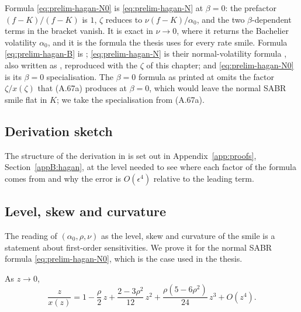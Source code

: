\documentclass[../../../main.tex]{subfiles}
\begin{document}
Formula \eqref{eq:prelim-hagan-N0} is \eqref{eq:prelim-hagan-N} at $\beta=0$: the prefactor $(f-K)/(f-K)$ is $1$, $\zeta$ reduces to $\nu(f-K)/\alpha_0$, and the two $\beta$-dependent terms in the bracket vanish. It is exact in $\nu\to0$, where it returns the Bachelier volatility $\alpha_0$, and it is the formula the thesis uses for every rate smile. Formula \eqref{eq:prelim-hagan-B} is \cite[eqs.~(2.17a)--(2.17c)]{hagan2002}; \eqref{eq:prelim-hagan-N} is their normal-volatility formula \cite[eq.~(A.67a)]{hagan2002}, also written as \cite[eq.~(A.69a)]{hagan2002}, reproduced with the $\zeta$ of this chapter; and \eqref{eq:prelim-hagan-N0} is its $\beta=0$ specialisation. The $\beta=0$ formula as printed at \cite[eq.~(A.70a)]{hagan2002} omits the factor $\zeta/x(\zeta)$ that (A.67a) produces at $\beta=0$, which would leave the normal SABR smile flat in $K$; we take the specialisation from (A.67a).

\subsection{Derivation sketch}

The structure of the derivation in \cite{hagan2002} is set out in Appendix~\ref{app:proofs}, Section~\ref{appB:hagan}, at the level needed to see where each factor of the formula comes from and why the error is $O(\epsilon^4)$ relative to the leading term.

\subsection{Level, skew and curvature}

The reading of $(\alpha_0,\rho,\nu)$ as the level, skew and curvature of the smile is a statement about first-order sensitivities. We prove it for the normal SABR formula \eqref{eq:prelim-hagan-N0}, which is the case used in the thesis.

\begin{lemma}[Expansion of $z/x(z)$]\label{lem:prelim-zx-series}
As $z\to0$,
\begin{equation}\label{eq:prelim-zx-series}
\frac{z}{x(z)}=1-\frac\rho2\,z+\frac{2-3\rho^2}{12}\,z^2+\frac{\rho(5-6\rho^2)}{24}\,z^3+O(z^4).
\end{equation}
\end{lemma}
\end{document}
